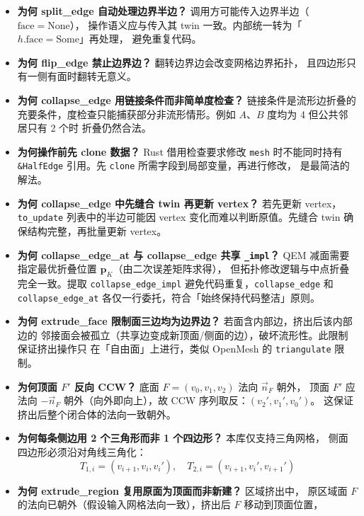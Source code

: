 \documentclass[11pt,a4paper]{article}
\begin{document}
\begin{itemize}
  \item \textbf{为何 split\_edge 自动处理边界半边？} 调用方可能传入边界半边（$\mathrm{face}=\mathrm{None}$），
        操作语义应与传入其 twin 一致。内部统一转为「$h.\mathrm{face} = \mathrm{Some}$」再处理，
        避免重复代码。
  \item \textbf{为何 flip\_edge 禁止边界边？} 翻转边界边会改变网格边界拓扑，
        且四边形只有一侧有面时翻转无意义。
  \item \textbf{为何 collapse\_edge 用链接条件而非简单度检查？} 链接条件是流形边折叠的
        充要条件，度检查只能捕获部分非流形情形。例如 $A$、$B$ 度均为 4 但公共邻居只有 2 个时
        折叠仍然合法。
  \item \textbf{为何操作前先 clone 数据？} Rust 借用检查要求修改 \texttt{mesh} 时不能同时持有
        \texttt{\&HalfEdge} 引用。先 \texttt{clone} 所需字段到局部变量，再进行修改，
        是最简洁的解法。
  \item \textbf{为何 collapse\_edge 中先缝合 twin 再更新 vertex？} 若先更新 vertex，
        \texttt{to\_update} 列表中的半边可能因 vertex 变化而难以判断原值。先缝合 twin
        确保结构完整，再批量更新 vertex。
  \item \textbf{为何 collapse\_edge\_at 与 collapse\_edge 共享 \texttt{\_impl}？}
        QEM 减面需要指定最优折叠位置 $\mathbf{p}_K$（由二次误差矩阵求得），
        但拓扑修改逻辑与中点折叠完全一致。提取 \texttt{collapse\_edge\_impl}
        避免代码重复，\texttt{collapse\_edge} 和 \texttt{collapse\_edge\_at}
        各仅一行委托，符合「始终保持代码整洁」原则。
  \item \textbf{为何 extrude\_face 限制面三边均为边界边？} 若面含内部边，挤出后该内部边的
        邻接面会被孤立（共享边变成新顶面/侧面的边），破坏流形性。此限制保证挤出操作只
        在「自由面」上进行，类似 OpenMesh 的 \texttt{triangulate} 限制。
  \item \textbf{为何顶面 $F'$ 反向 CCW？} 底面 $F = (v_0, v_1, v_2)$ 法向 $\vec{n}_F$ 朝外，
        顶面 $F'$ 应法向 $-\vec{n}_F$ 朝外（向外即向上），故 CCW 序列取反：$(v_2', v_1', v_0')$。
        这保证挤出后整个闭合体的法向一致朝外。
  \item \textbf{为何每条侧边用 2 个三角形而非 1 个四边形？} 本库仅支持三角网格，
        侧面四边形必须沿对角线三角化：
        \[
          T_{1,i} = (v_{i+1}, v_i, v_i'),\quad
          T_{2,i} = (v_{i+1}, v_i', v_{i+1}')
        \]
  \item \textbf{为何 extrude\_region 复用原面为顶面而非新建？} 区域挤出中，
        原区域面 $F$ 的法向已朝外（假设输入网格法向一致），挤出后 $F$ 移动到顶面位置，

\end{itemize}
\end{document}
